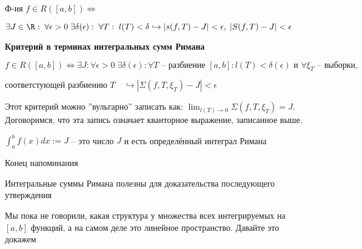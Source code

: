 \begin{reminder}
    \begin{definition}
        Ф-ия $f \in R([a, b]) \Longleftrightarrow$
        
        $\exists J \in \R:\; \forall \epsilon > 0\; \exists \delta(\epsilon):\; \forall T: \; l(T) < \delta \hookrightarrow |s(f, T) - J| < \epsilon,\; |S(f, T) - J| < \epsilon$
    \end{definition}\bigskip
    
     \textbf{Критерий в терминах интегральных сумм Римана}
    
     $f \in R([a, b]) \Longleftrightarrow \exists J: \forall \epsilon > 0\; \exists \delta(\epsilon): \forall T \text{ -- разбиение }[a, b]: l(T) < \delta(\epsilon)\text{ и }\forall\xi_T\text{ -- выборки,}$
     
     $\text{соответстующей разбиению } T\quad \hookrightarrow |\Sigma(f, T, \xi_T) - J|< \epsilon$
     
     Этот критерий можно ''вульгарно''\; записать как: $\lim_{l(T)\rightarrow 0}\Sigma(f, T, \xi_T) = J$.
     Договоримся, что эта запись означает кванторное выражение, записанное выше.
     
     
     $\int_a^b f(x)dx := J$ -- это число $J$ и есть определённый интеграл Римана

     Конец напоминания
\end{reminder}

Интегральные суммы Римана полезны для доказательства последующего утверждения\bigskip

Мы пока не говорили, какая структура у множества всех интегрируемых на $[a, b]$ функций, а на самом деле это линейное пространство. Давайте это докажем

